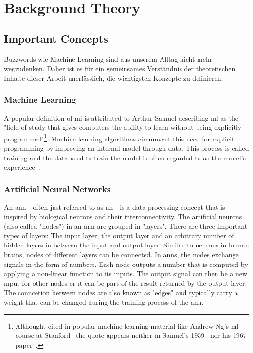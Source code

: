 \documentclass[
			   fontsize=11pt,
               paper=a4,
               bibliography=totoc,
               idxtotoc,
               headsepline,
               footsepline,
               footinclude=false,
               BCOR=12mm,
               DIV=13,
               openany,   %
               ]
               {scrbook}
\begin{document}
\chapter{Background Theory}

\section{Important Concepts}

Buzzwords wie Machine Learning sind aus unserem Alltag nicht mehr wegzudenken. Daher ist es für ein gemeinsames Verständnis der theoretischen Inhalte dieser Arbeit unerlässlich, die wichtigsten Konzepte zu definieren.

\subsection{Machine Learning}

A popular definition of \gls{ml} is attributed to Arthur Samuel describing \gls{ml} as the "field of study that gives computers the ability to learn without being explicitly programmed"\footnote{Althought cited in popular machine learning material like Andrew Ng's \gls{ml} course at Stanford~\cite{mlCourseStan} the quote appears neither in Samuel's 1959~\cite{mlQuote1959} nor his 1967 paper~\cite{mlQuote1967}.}. Machine learning algorithms circumvent this need for explicit programming by improving an internal model through data. This process is called training and the data used to train the model is often regarded to as the model's experience~\cite{mlMitchell}.

\subsection{Artificial Neural Networks}

An \gls{ann} - often just referred to as \gls{nn} - is a data processing concept that is inspired by biological neurons and their interconnectivity. The artificial neurons (also called "nodes") in an \gls{ann} are grouped in "layers". There are three important types of layers: The input layer, the output layer and an arbitrary number of hidden layers in between the input and output layer. Similar to neurons in human brains, nodes of different layers can be connected. In \glspl{ann}, the nodes exchange signals in the form of numbers. Each node outputs a number that is computed by applying a non-linear function to its inputs. The output signal can then be a new input for other nodes or it can be part of the result returned by the output layer. The conncetion between nodes are also known as "edges" and typically carry a weight that can be changed during the training process of the \gls{ann}. 
\end{document}
